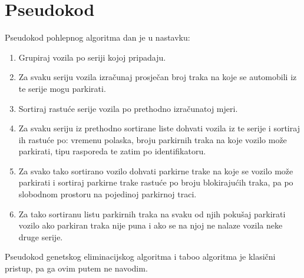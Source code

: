 \documentclass[11pt]{article}
\begin{document}
\section{Pseudokod}
Pseudokod pohlepnog algoritma dan je u nastavku:


\begin{enumerate}
\item Grupiraj vozila po seriji kojoj pripadaju.
\item Za svaku seriju vozila izračunaj prosječan broj traka na koje se automobili iz te serije mogu parkirati.
\item Sortiraj rastuće serije vozila po prethodno izračunatoj mjeri.
\item Za svaku seriju iz prethodno sortirane liste dohvati vozila iz te serije i sortiraj ih rastuće po: vremenu polaska, broju parkirnih traka na koje vozilo može parkirati, tipu rasporeda te zatim po identifikatoru.
\item Za svako tako sortirano vozilo dohvati parkirne trake na koje se vozilo može parkirati i sortiraj parkirne trake rastuće po broju blokirajućih traka, pa po slobodnom prostoru na pojedinoj parkirnoj traci.
\item Za tako sortiranu listu parkirnih traka na svaku od njih pokušaj parkirati vozilo ako parkiran traka nije puna i ako se na njoj ne nalaze vozila neke druge serije.
\end{enumerate}

Pseudokod genetskog eliminacijskog algoritma i taboo algoritma je klasični pristup, pa ga ovim putem ne navodim.
\end{document}
